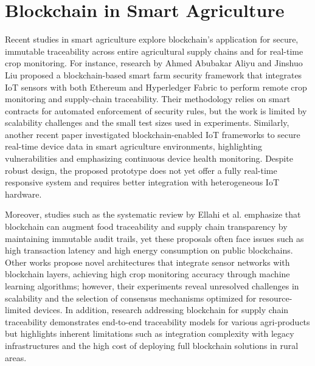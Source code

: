 \documentclass[12pt,onecolumn]{IEEEtran} %
\begin{document}
\section{Blockchain in Smart Agriculture}\label{sec:blockchain}
Recent studies in smart agriculture explore blockchain's application for secure, immutable traceability across entire agricultural supply chains and for real-time crop monitoring. For instance, research by Ahmed Abubakar Aliyu and Jinshuo Liu \cite{aliyu2023blockchainbasedsmartfarm} proposed a blockchain-based smart farm security framework that integrates IoT sensors with both Ethereum and Hyperledger Fabric to perform remote crop monitoring and supply-chain traceability. Their methodology relies on smart contracts for automated enforcement of security rules, but the work is limited by scalability challenges and the small test sizes used in experiments. Similarly, another recent paper \cite{aliyu2023blockchainbasedsmartfarm} investigated blockchain-enabled IoT frameworks to secure real-time device data in smart agriculture environments, highlighting vulnerabilities and emphasizing continuous device health monitoring. Despite robust design, the proposed prototype does not yet offer a fully real-time responsive system and requires better integration with heterogeneous IoT hardware.

Moreover, studies such as the systematic review by Ellahi et al. \cite{ellahi2023blockchainbasedframeworksfor} emphasize that blockchain can augment food traceability and supply chain transparency by maintaining immutable audit trails, yet these proposals often face issues such as high transaction latency and high energy consumption on public blockchains. Other works \cite{sakthivel2024enhancingtransparencyand, sizan2505asecuredtriad} propose novel architectures that integrate sensor networks with blockchain layers, achieving high crop monitoring accuracy through machine learning algorithms; however, their experiments reveal unresolved challenges in scalability and the selection of consensus mechanisms optimized for resource-limited devices. In addition, research addressing blockchain for supply chain traceability \cite{vitaskos2024blockchainandinternet, tang2024assessingblockchainand} demonstrates end-to-end traceability models for various agri-products but highlights inherent limitations such as integration complexity with legacy infrastructures and the high cost of deploying full blockchain solutions in rural areas.
\end{document}
